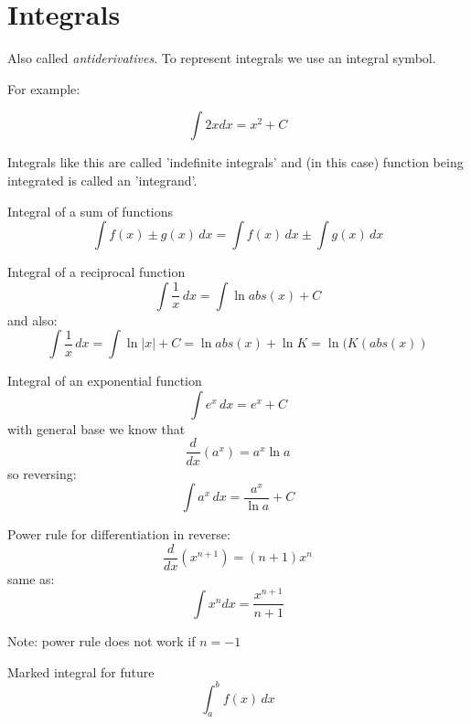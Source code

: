 \documentclass{article}
\begin{document}
\section{Integrals}
Also called \textit{antiderivatives}. To represent integrals we use an integral
symbol.

For example:

\begin{equation}
  \int 2x dx = x^2 + C
\end{equation}

Integrals like this are called 'indefinite integrals' and (in this case)
function being integrated is called an 'integrand'.


Integral of a sum of functions
\begin{equation}
  \int f(x) \pm g(x) \, dx = \int f(x) \, dx \pm \int g(x) \, dx
\end{equation}

Integral of a reciprocal function
\begin{equation}
  \int \frac{1}{x} \, dx = \int \ln abs(x) + C
\end{equation}
and also:
\begin{equation}
  \int \frac{1}{x} \, dx = \int \ln|x| + C = \ln abs(x) + \ln K = \ln (K (abs(x))
\end{equation}

Integral of an exponential function
\begin{equation}
  \int e^x \, dx = e^x + C
\end{equation}
with general base we know that
\begin{equation}
  \frac{d}{dx} (a^x) = a^x \ln a
\end{equation}
so reversing:
\begin{equation}
  \int a^x \, dx = \frac{a^x}{\ln a} + C
\end{equation}

Power rule for differentiation in reverse:
\begin{equation}
  \frac{d}{dx}(x^{n+1}) = (n+1)x^n
\end{equation}
same as:
\begin{equation}
  \int x^ndx = \frac{x^{n+1}}{n+1}
\end{equation}

Note: power rule does not work if $n=-1$

Marked integral for future
\begin{equation}
  \int_{a}^{b} f(x) \, dx
\end{equation}
\end{document}
